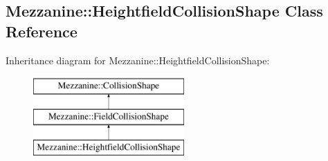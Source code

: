 \hypertarget{classMezzanine_1_1HeightfieldCollisionShape}{
\subsection{Mezzanine::HeightfieldCollisionShape Class Reference}
\label{classMezzanine_1_1HeightfieldCollisionShape}
}
Inheritance diagram for Mezzanine::HeightfieldCollisionShape:\begin{figure}[H]
\begin{center}
\leavevmode
\includegraphics[height=3.000000cm]{classMezzanine_1_1HeightfieldCollisionShape}
\end{center}
\end{figure}
